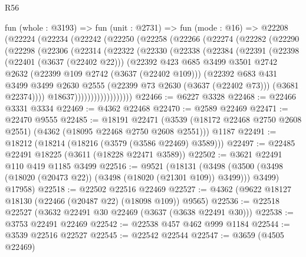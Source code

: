 \begin{lexlean}{R56}
\begin{coremodule}
    fun (whole : @3193) =>
    fun (unit : @2731) =>
    fun (mode : @16) =>
    @22208
      (@22224
        (@22234
          (@22242
            (@22250
              (@22258
                (@22266
                  (@22274
                    (@22282
                      (@22290
                        (@22298
                          (@22306
                            (@22314
                              (@22322
                                (@22330
                                  (@22338
                                    (@22384
                                      (@22391
                                        (@22398
                                          (@22401 (@3637 (@22402 @22)))
                                          (@22392
                                            @423
                                            @685
                                            @3499
                                            @3501
                                            @2742
                                            @2632
                                            (@22399 @109 @2742 (@3637 (@22402 @109)))
                                            (@22392
                                              @683
                                              @431
                                              @3499
                                              @3499
                                              @2630
                                              @2555
                                              (@22399 @73 @2630 (@3637 (@22402 @73)))
                                              (@3681 @22374))))
                                        @18637))))))))))))))))))
@22466 := @6227 @3328
@22468 := @22466 @3331 @3334
@22469 := @4362 @22468
@22470 := @2589 @22469
@22471 := @22470 @9555
@22485 := @18191
    @22471
    (@3539 (@18172 @22468 @2750 @2608 @2551) (@4362 (@18095 @22468 @2750 @2608 @2551)))
    @1187
@22491 := @18212 (@18214 (@18216 (@3579 (@3586 @22469) @3589)))
@22497 := @22485 @22491 @18225 (@3611 (@18228 @22471 @3589))
@22502 := @3621 @22491 @110 @419 @1185 @3499
@22516 := @9521
    (@18131
      (@3498 (@3500 (@3498 (@18020 (@20473 @22)) (@3498 (@18020 (@21301 @109)) @3499))) @3499)
      @17958)
@22518 := @22502 @22516 @22469
@22527 := @4362 (@9622 @18127 @18130 (@22466 (@20487 @22) (@18098 @109)) @9565)
@22536 := @22518 @22527 (@3632 @22491 @30 @22469 (@3637 (@3638 @22491 @30)))
@22538 := @3753 @22491 @22469
@22542 := @22538 @457 @462 @999 @1184
@22544 := @3539 @22516 @22527
@22545 := @22542 @22544
@22547 := @3659 (@4505 @22469)

\end{coremodule}
\end{lexlean}
